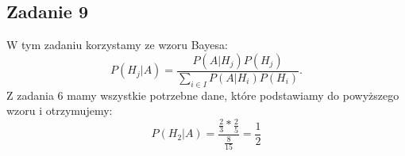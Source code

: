 \subsection{Zadanie 9}

W tym zadaniu korzystamy ze wzoru Bayesa:
$$
P(H_j|A)=\frac{P(A|H_j)P(H_j)}{\sum_{i \in I} P(A|H_i)P(H_i) }.
$$
Z zadania 6 mamy wszystkie potrzebne dane, które podstawiamy do powyższego wzoru i otrzymujemy:
$$
P(H_2|A) = \frac{\frac{2}{3}*\frac{2}{5}}{\frac{8}{15}} = \frac{1}{2}
$$

